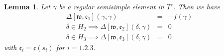 \documentclass[11pt]{amsart}
\numberwithin{equation}{section}
\newtheorem{lem}[equation]{Lemma}
\def\fe{\mathfrak{e}}
\def\fw{\mathfrak{w}}
\def\C{\mathbb{C}}
\newcommand{\<}{\left\langle}
\renewcommand{\>}{\right\rangle}
\begin{document}
  \begin{lem}\label{Delta3} Let $\gamma$ be a regular semisimple element in $T^\varepsilon$.    Then we have
  \begin{eqnarray*}
   \Delta[\fw, \fe_1](\gamma, \gamma) & =&  - f(\gamma)\\
\delta \in H_2 \implies   \Delta[\fw, \fe_2](\delta, \gamma)  & =& 0\\
\delta \in H_3 \implies \Delta[\fw, \fe_3](\delta, \gamma)   &=& 0
  \end{eqnarray*}
  with $\fe_i = \fe(s_i)$ for $i = 1.2.3$.
  
 \end{lem}
\end{document}
